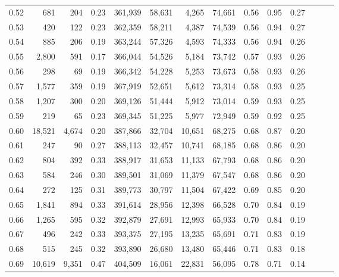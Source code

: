 \begin{tabular}{rrrrrrrrrrrrrr}
0.52 &     681 &     204 &  0.23 &  361,939 &   58,631 &   4,265 &  74,661 &  0.56 &  0.95 &      0.27 \\
0.53 &     420 &     122 &  0.23 &  362,359 &   58,211 &   4,387 &  74,539 &  0.56 &  0.94 &      0.27 \\
0.54 &     885 &     206 &  0.19 &  363,244 &   57,326 &   4,593 &  74,333 &  0.56 &  0.94 &      0.26 \\
0.55 &   2,800 &     591 &  0.17 &  366,044 &   54,526 &   5,184 &  73,742 &  0.57 &  0.93 &      0.26 \\
0.56 &     298 &      69 &  0.19 &  366,342 &   54,228 &   5,253 &  73,673 &  0.58 &  0.93 &      0.26 \\
0.57 &   1,577 &     359 &  0.19 &  367,919 &   52,651 &   5,612 &  73,314 &  0.58 &  0.93 &      0.25 \\
0.58 &   1,207 &     300 &  0.20 &  369,126 &   51,444 &   5,912 &  73,014 &  0.59 &  0.93 &      0.25 \\
0.59 &     219 &      65 &  0.23 &  369,345 &   51,225 &   5,977 &  72,949 &  0.59 &  0.92 &      0.25 \\
0.60 &  18,521 &   4,674 &  0.20 &  387,866 &   32,704 &  10,651 &  68,275 &  0.68 &  0.87 &      0.20 \\
0.61 &     247 &      90 &  0.27 &  388,113 &   32,457 &  10,741 &  68,185 &  0.68 &  0.86 &      0.20 \\
0.62 &     804 &     392 &  0.33 &  388,917 &   31,653 &  11,133 &  67,793 &  0.68 &  0.86 &      0.20 \\
0.63 &     584 &     246 &  0.30 &  389,501 &   31,069 &  11,379 &  67,547 &  0.68 &  0.86 &      0.20 \\
0.64 &     272 &     125 &  0.31 &  389,773 &   30,797 &  11,504 &  67,422 &  0.69 &  0.85 &      0.20 \\
0.65 &   1,841 &     894 &  0.33 &  391,614 &   28,956 &  12,398 &  66,528 &  0.70 &  0.84 &      0.19 \\
0.66 &   1,265 &     595 &  0.32 &  392,879 &   27,691 &  12,993 &  65,933 &  0.70 &  0.84 &      0.19 \\
0.67 &     496 &     242 &  0.33 &  393,375 &   27,195 &  13,235 &  65,691 &  0.71 &  0.83 &      0.19 \\
0.68 &     515 &     245 &  0.32 &  393,890 &   26,680 &  13,480 &  65,446 &  0.71 &  0.83 &      0.18 \\
0.69 &  10,619 &   9,351 &  0.47 &  404,509 &   16,061 &  22,831 &  56,095 &  0.78 &  0.71 &      0.14 \\

\end{tabular}
